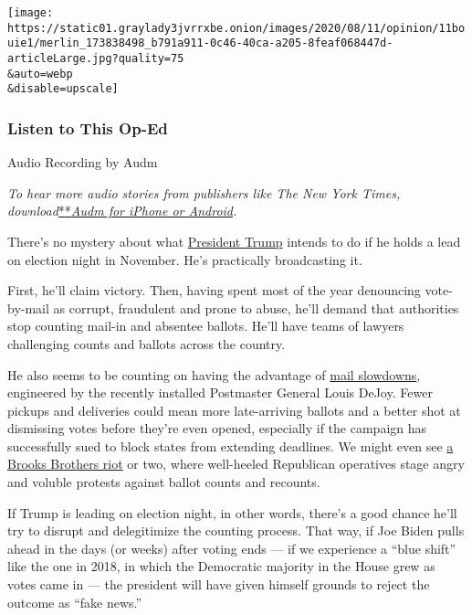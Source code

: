 \texttt{[image: https://static01.graylady3jvrrxbe.onion/images/2020/08/11/opinion/11bouie1/merlin\_173838498\_b791a911-0c46-40ca-a205-8feaf068447d-articleLarge.jpg?quality=75\\\&auto=webp\\\&disable=upscale]}

\hypertarget{listen-to-this-op-ed}{%
\subsubsection{Listen to This Op-Ed}\label{listen-to-this-op-ed}}

Audio Recording by Audm

\emph{To hear more audio stories from publishers like The New York
Times,
download}\href{https://www.audm.com/?utm_source=nytmag\&utm_medium=embed\&utm_campaign=left_behind_draper}{**}\href{https://www.audm.com/?utm_source=nytopinion\&utm_medium=embed\&utm_campaign=foil_trump_strategy}{\emph{Audm
for iPhone or Android}}\emph{.}

There's no mystery about what
\href{https://www.nytimes3xbfgragh.onion/2020/09/03/us/politics/trump-2020-election.html}{President
Trump} intends to do if he holds a lead on election night in November.
He's practically broadcasting it.

First, he'll claim victory. Then, having spent most of the year
denouncing vote-by-mail as corrupt, fraudulent and prone to abuse, he'll
demand that authorities stop counting mail-in and absentee ballots.
He'll have teams of lawyers challenging counts and ballots across the
country.

He also seems to be counting on having the advantage of
\href{https://www.nytimes3xbfgragh.onion/2020/08/07/us/politics/postal-service-reorganization-mail-ballots.html}{mail
slowdowns}, engineered by the recently installed Postmaster General
Louis DeJoy. Fewer pickups and deliveries could mean more late-arriving
ballots and a better shot at dismissing votes before they're even
opened, especially if the campaign has successfully sued to block states
from extending deadlines. We might even see
\href{https://www.washingtonpost.com/wp-dyn/articles/A31074-2005Jan23.html}{a
Brooks Brothers riot} or two, where well-heeled Republican operatives
stage angry and voluble protests against ballot counts and recounts.

If Trump is leading on election night, in other words, there's a good
chance he'll try to disrupt and delegitimize the counting process. That
way, if Joe Biden pulls ahead in the days (or weeks) after voting ends
--- if we experience a ``blue shift'' like the one in 2018, in which the
Democratic majority in the House grew as votes came in --- the president
will have given himself grounds to reject the outcome as ``fake news.''

